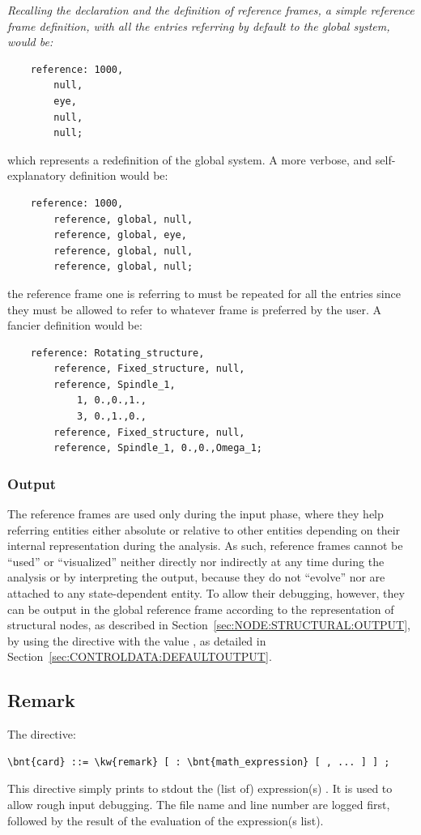 {\em
    Recalling the declaration and the definition of reference frames,
    a simple reference frame definition, with all the entries referring 
    by default to the global system, would be:
    \begin{verbatim}
    reference: 1000,
        null,
        eye,
        null,
        null;
    \end{verbatim}
    which represents a redefinition of the global system.
    A more verbose, and self-explanatory definition would be:
    \begin{verbatim}
    reference: 1000,
        reference, global, null,
        reference, global, eye,
        reference, global, null,
        reference, global, null;			 
    \end{verbatim}
    the reference frame one is referring to must be repeated for all the entries
    since they must be allowed to refer to whatever frame is preferred 
    by the user.
    A fancier definition would be:
    \begin{verbatim}
    reference: Rotating_structure, 
        reference, Fixed_structure, null,
        reference, Spindle_1,
            1, 0.,0.,1., 
            3, 0.,1.,0.,
        reference, Fixed_structure, null,
        reference, Spindle_1, 0.,0.,Omega_1;
    \end{verbatim}
}

\subsubsection{Output}
The reference frames are used only during the input phase, 
where they help referring entities either absolute 
or relative to other entities depending on their internal representation
during the analysis.
As such, reference frames cannot be ``used'' or ``visualized'' neither 
directly nor indirectly at any time during the analysis or by interpreting
the output, because they do not ``evolve'' nor are attached
to any state-dependent entity.
To allow their debugging, however, they can be output in the global
reference frame according to the representation of structural nodes,
as described in Section~\ref{sec:NODE:STRUCTURAL:OUTPUT}, 
by using the  directive 
with the value , as detailed
in Section~\ref{sec:CONTROLDATA:DEFAULTOUTPUT}.



\subsection{Remark}
The  directive:
\begin{Verbatim}[commandchars=\\\{\}]
    \bnt{card} ::= \kw{remark} [ : \bnt{math_expression} [ , ... ] ] ;
\end{Verbatim}
This directive simply prints to stdout the (list of) expression(s) .
It is used to allow rough input debugging. The file name and line number
are logged first, followed by the result of the evaluation of the expression(s list). 

